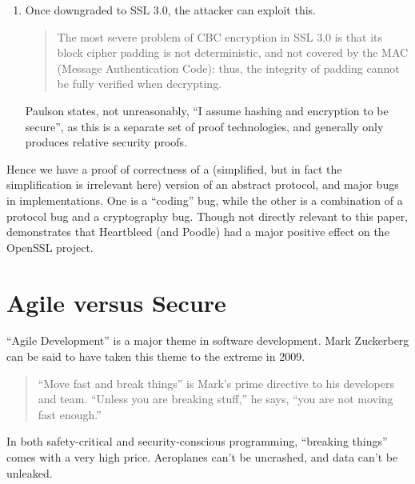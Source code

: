 \documentclass{eptcs}
\begin{document}
\begin{description}
\begin{enumerate}
\item Once downgraded to SSL 3.0, the attacker can exploit this.
\begin{quote}
The most severe problem of CBC encryption in SSL 3.0 is that its block cipher padding is
not deterministic, and not covered by the MAC (Message Authentication Code): thus, the
integrity of padding cannot be fully verified when decrypting. \cite{Molleretal2014a}
\end{quote}
Paulson \cite{Paulson1999} states, not unreasonably, ``I assume hashing and encryption to be secure'', as this is a separate set of proof technologies, and generally only produces relative security proofs.
\end{enumerate}
\end{description}
Hence we have a proof of correctness of a (simplified, but in fact the simplification is irrelevant here) version of an abstract protocol, and major bugs in implementations. One is a ``coding'' bug, while the other is a combination of a protocol bug and a cryptography bug.  Though not directly relevant to this paper, \cite{Salz2017a} demonstrates that Heartbleed (and Poodle) had a major positive effect on the OpenSSL project.
\section{Agile versus Secure}
``Agile Development'' \cite{Becketal2001} is a major theme in software development. 
Mark Zuckerberg can be said to have taken this theme to the extreme in 2009.
\begin{quote}
``Move fast and break things'' is Mark's prime directive to his developers and team. ``Unless you are breaking stuff,'' he says, ``you are not moving fast enough.''  \cite{Blodget2009a}
\end{quote}
In both safety-critical and security-conscious programming, ``breaking things'' comes with a very high price. Aeroplanes can't be uncrashed, and data can't be unleaked. 
\end{document}
